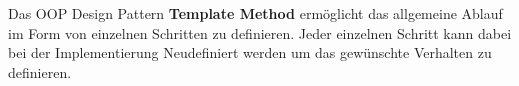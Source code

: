 Das OOP Design Pattern \textbf{Template Method} ermöglicht das allgemeine Ablauf im Form von einzelnen Schritten zu definieren.
Jeder einzelnen Schritt kann dabei bei der Implementierung Neudefiniert werden um das gewünschte Verhalten zu definieren.
